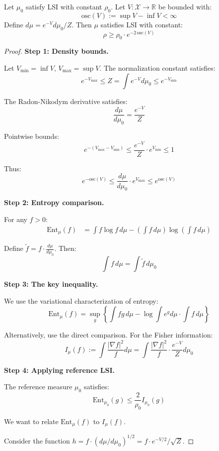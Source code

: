\begin{theorem}
\label{thm:holley-stroock-complete}
Let $\mu_0$ satisfy LSI with constant $\rho_0$. Let $V: \mathcal{X} \to \mathbb{R}$ 
be bounded with:
\[
\text{osc}(V) := \sup V - \inf V < \infty
\]
Define $d\mu = e^{-V} d\mu_0 / Z$. Then $\mu$ satisfies LSI with constant:
\[
\rho \geq \rho_0 \cdot e^{-2\,\text{osc}(V)}
\]
\end{theorem}

\begin{proof}
\textbf{Step 1: Density bounds.}

Let $V_{\min} = \inf V$, $V_{\max} = \sup V$. The normalization constant satisfies:
\[
e^{-V_{\max}} \leq Z = \int e^{-V} d\mu_0 \leq e^{-V_{\min}}
\]

The Radon-Nikodym derivative satisfies:
\[
\frac{d\mu}{d\mu_0} = \frac{e^{-V}}{Z}
\]

Pointwise bounds:
\[
e^{-(V_{\max} - V_{\min})} \leq \frac{e^{-V}}{Z} \cdot e^{V_{\min}} \leq 1
\]

Thus:
\[
e^{-\text{osc}(V)} \leq \frac{d\mu}{d\mu_0} \cdot e^{V_{\max}} \leq e^{\text{osc}(V)}
\]

\textbf{Step 2: Entropy comparison.}

For any $f > 0$:
\begin{align}
\text{Ent}_\mu(f) &= \int f \log f \, d\mu - \left(\int f \, d\mu\right)\log\left(\int f \, d\mu\right)
\end{align}

Define $\tilde{f} = f \cdot \frac{d\mu}{d\mu_0}$. Then:
\[
\int f \, d\mu = \int \tilde{f} \, d\mu_0
\]

\textbf{Step 3: The key inequality.}

We use the variational characterization of entropy:
\[
\text{Ent}_\mu(f) = \sup_g \left\{ \int fg \, d\mu - \log \int e^g d\mu \cdot \int f \, d\mu \right\}
\]

Alternatively, use the direct comparison. For the Fisher information:
\[
I_\mu(f) := \int \frac{|\nabla f|^2}{f} d\mu = \int \frac{|\nabla f|^2}{f} \cdot \frac{e^{-V}}{Z} d\mu_0
\]

\textbf{Step 4: Applying reference LSI.}

The reference measure $\mu_0$ satisfies:
\[
\text{Ent}_{\mu_0}(g) \leq \frac{2}{\rho_0} I_{\mu_0}(g)
\]

We want to relate $\text{Ent}_\mu(f)$ to $I_\mu(f)$.

Consider the function $h = f \cdot (d\mu/d\mu_0)^{1/2} = f \cdot e^{-V/2}/\sqrt{Z}$.


\end{proof}
